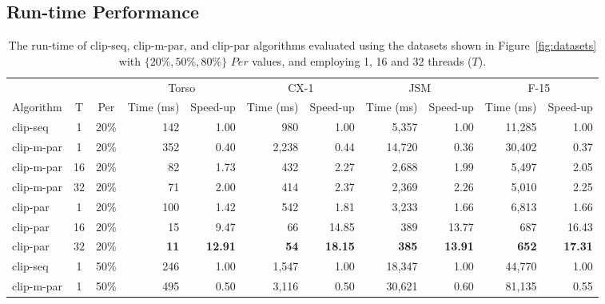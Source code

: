 \documentclass{egpubl}
\begin{document}
\subsection{Run-time Performance}

\begin{table}[t]
\centering
\caption{
The run-time of clip-seq, clip-m-par, and clip-par algorithms evaluated using the datasets shown in Figure~\ref{fig:datasets} with  $\{20\%, 50\%, 80\%\}$ $Per$ values,
and employing 1, 16 and 32 threads ($T$).}
\label{tab:run-time}
\begin{tabular}{lcc@{\quad\quad}rr@{\quad\quad}rr@{\quad\quad}rr@{\quad\quad}rr}
\toprule
\multicolumn{3}{l}{}  & \multicolumn{2}{c}{Torso}  & \multicolumn{2}{c}{CX-1} & \multicolumn{2}{c}{JSM}  & \multicolumn{2}{c}{F-15}     \\
Algorithm  & T  & Per & Time (ms)  & Speed-up      & Time (ms) & Speed-up     & Time (ms) & Speed-up     & Time (ms)    & Speed-up     \\
\midrule
clip-seq   & 1  & 20\% & 142        & 1.00         & 980       & 1.00         & 5,357      & 1.00         & 11,285       & 1.00         \\
clip-m-par & 1  & 20\% & 352        & 0.40         & 2,238     & 0.44         & 14,720     & 0.36         & 30,402       & 0.37         \\
clip-m-par & 16 & 20\% & 82         & 1.73         & 432       & 2.27         & 2,688      & 1.99         & 5,497        & 2.05         \\
clip-m-par & 32 & 20\% & 71         & 2.00         & 414       & 2.37         & 2,369      & 2.26         & 5,010        & 2.25         \\
clip-par   & 1  & 20\% & 100        & 1.42         & 542       & 1.81         & 3,233      & 1.66         & 6,813        & 1.66         \\
clip-par   & 16 & 20\% & 15         & 9.47         & 66        & 14.85        & 389        & 13.77        & 687          & 16.43        \\
clip-par   & 32 & 20\% &\textbf{11} &\textbf{12.91}&\textbf{54}&\textbf{18.15}&\textbf{385}&\textbf{13.91}&\textbf{652}  &\textbf{17.31}\\[1ex]
clip-seq   & 1  & 50\% & 246        & 1.00         & 1,547     & 1.00         & 18,347     & 1.00         & 44,770       & 1.00         \\
clip-m-par & 1  & 50\% & 495        & 0.50         & 3,116     & 0.50         & 30,621     & 0.60         & 81,135       & 0.55         \\

\end{tabular}
\end{table}
\end{document}
